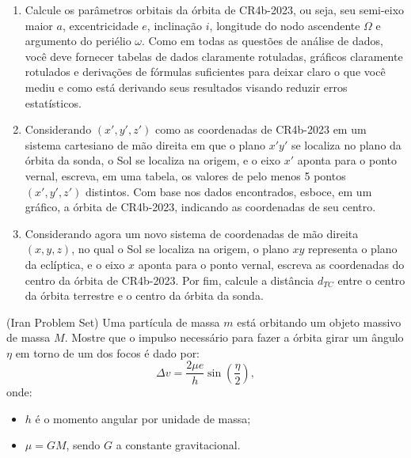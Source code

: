 \documentclass[11pt]{article}
\begin{document}
\begin{pproblem}
    \begin{enumerate}[label=(\alph*)]
        \item Calcule os parâmetros orbitais da órbita de CR4b-2023, ou seja, seu semi-eixo maior \(a\), excentricidade \(e\), inclinação \(i\), longitude do nodo ascendente \(\Omega\) e argumento do periélio \(\omega\). Como em todas as questões de análise de dados, você deve fornecer tabelas de dados claramente rotuladas, gráficos claramente rotulados e derivações de fórmulas suficientes para deixar claro o que você mediu e como está derivando seus resultados visando reduzir erros estatísticos.
        
        \item Considerando \((x', y', z')\) como as coordenadas de CR4b-2023 em um sistema cartesiano de mão direita em que o plano \(x'y'\) se localiza no plano da órbita da sonda, o Sol se localiza na origem, e o eixo \(x'\) aponta para o ponto vernal, escreva, em uma tabela, os valores de pelo menos 5 pontos \((x', y', z')\) distintos. Com base nos dados encontrados, esboce, em um gráfico, a órbita de CR4b-2023, indicando as coordenadas de seu centro.
        
        \item Considerando agora um novo sistema de coordenadas de mão direita \((x, y, z)\), no qual o Sol se localiza na origem, o plano \(xy\) representa o plano da eclíptica, e o eixo \(x\) aponta para o ponto vernal, escreva as coordenadas do centro da órbita de CR4b-2023. Por fim, calcule a distância \(d_{TC}\) entre o centro da órbita terrestre e o centro da órbita da sonda.
    \end{enumerate}

    
\end{pproblem}

\begin{pproblem} (Iran Problem Set) 
    Uma partícula de massa \(m\) está orbitando um objeto massivo de massa \(M\). Mostre que o impulso necessário para fazer a órbita girar um ângulo \(\eta\) em torno de um dos focos é dado por:
    \[
    \Delta v = \frac{2\mu e}{h}\sin\left(\frac{\eta}{2}\right),
    \]
    onde:
    \begin{itemize}
        \item \(h\) é o momento angular por unidade de massa;
        \item \(\mu = GM\), sendo \(G\) a constante gravitacional.
    \end{itemize}
    
\end{pproblem}
\end{document}
